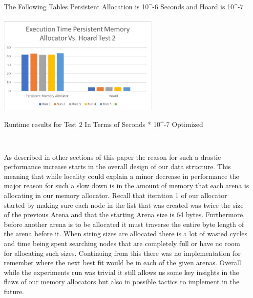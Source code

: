 \documentclass[conference]{IEEEtran}
\begin{document}
The Following Tables Persistent Allocation is 10^-6 Seconds and Hoard is 10^-7\\

 \\
 \includegraphics[width=8cm]{HoardGraph2.png}
\caption{Runtime results for Test 2 In Terms of Seconds * 10^-7 Optimized}
\label{fig7:Test 2 Optimized}
\\
 

\newline

As described in other sections of this paper the reason for such a drastic performance increase starts in the overall design of our data structure. This meaning that while locality could explain a minor decrease in performance the major reason for such a slow down is in the amount of memory that each arena is allocating in our memory allocator. Recall that iteration 1 of our allocator started by making sure each node in the list that was created was twice the size of the previous Arena and that the starting Arena size is 64 bytes. Furthermore, before another arena is to be allocated it must traverse the entire byte length of the arena before it. When string sizes are allocated there is a lot of wasted cycles and time being spent searching nodes that are completely full or have no room for allocating such sizes. Continuing from this there was no implementation for remember where the next best fit would be in each of the given arenas. Overall while the experiments run was trivial it still allows us some key insights in the flaws of our memory allocators but also in possible tactics to implement in the future. 
\end{document}

